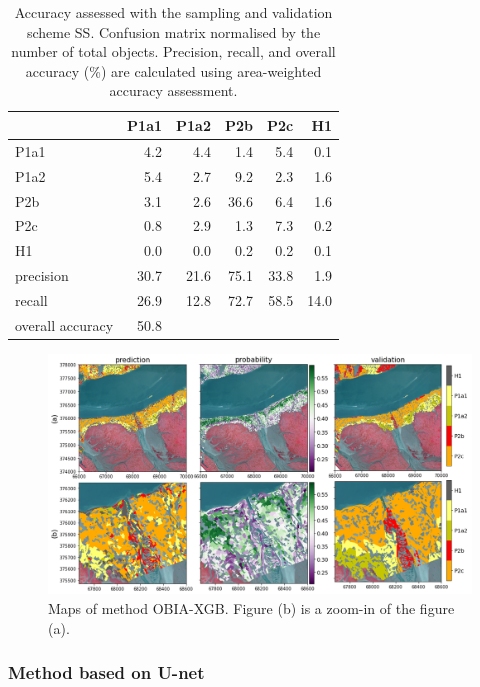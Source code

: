 \documentclass{isprs} %
\begin{document}
\begin{table}[]
    \centering
    
\begin{tabular}{lrrrrr}
\toprule
{} &  P1a1 &  P1a2 &  P2b &  P2c &   H1 \\
\midrule
P1a1             &   4.2 &   4.4 &  1.4 &  5.4 &  0.1 \\
P1a2             &   5.4 &   2.7 &  9.2 &  2.3 &  1.6 \\
P2b              &   3.1 &   2.6 & 36.6 &  6.4 &  1.6 \\
P2c              &   0.8 &   2.9 &  1.3 &  7.3 &  0.2 \\
H1               &   0.0 &   0.0 &  0.2 &  0.2 &  0.1 \\
precision        &  30.7 &  21.6 & 75.1 & 33.8 &  1.9 \\
recall           &  26.9 &  12.8 & 72.7 & 58.5 & 14.0 \\
overall accuracy &  50.8 &       &      &      &      \\
\bottomrule
\end{tabular}
    \caption{Accuracy assessed with the sampling and validation scheme SS. Confusion matrix normalised by the number of total objects. Precision, recall, and overall accuracy (\%) are calculated using area-weighted accuracy assessment.}
    \label{xgb_ss}
\end{table}


 \begin{figure}[!h]
    \centering
    \includegraphics[width=\linewidth]{figures/xgb_prediction_westerscheldt.png}
    \caption{Maps of method OBIA-XGB. Figure (b) is a zoom-in of the figure (a).}
    \label{fig:spxgb}
\end{figure}

\subsubsection{Method based on U-net}
\end{document}
